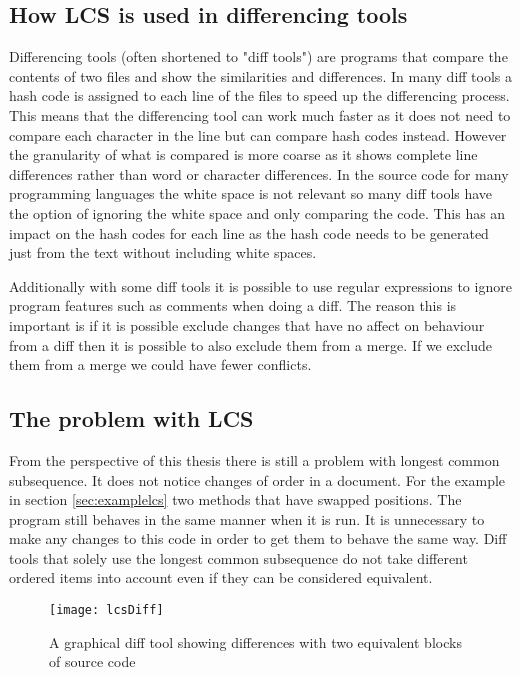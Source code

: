 
\subsection{How LCS is used in differencing tools}
Differencing tools (often shortened to "diff tools") are programs that compare the contents of two files and show the similarities and differences.
In many diff tools a hash code is assigned to each line of the files to speed up the differencing process.
This means that the differencing tool can work much faster as it does not need to compare each character in the line but can compare hash codes instead.
However the granularity of what is compared is more coarse as it shows complete line differences rather than word or character differences. 
In the source code for many programming languages the white space is not relevant so many diff tools have the option of ignoring the white space and only comparing the code.
This has an impact on the hash codes for each line as the hash code needs to be generated just from the text without including white spaces.

Additionally with some diff tools it is possible to use regular expressions to ignore program features such as comments when doing a diff.  The reason this is important is if it is possible exclude changes that have no affect on behaviour from a diff then it is possible to also exclude them from a merge.  If we exclude them from a merge we could have fewer conflicts.


\subsection{The problem with LCS}
From the perspective of this thesis there is still a problem with longest common subsequence. 
It does not notice changes of order in a document.  
For the example in section \ref{sec:examplelcs} two methods that have swapped positions.
The program still behaves in the same manner when it is run.
It is unnecessary to make any changes to this code in order to get them to behave the same way.
Diff tools that solely use the longest common subsequence do not take different ordered items into account even if they can be considered equivalent.

\begin{figure}[h]
\begin{center}
\texttt{[image: lcsDiff]}
\end{center}
 \caption{A graphical diff tool showing differences with two equivalent blocks of source code}
\end{figure}


